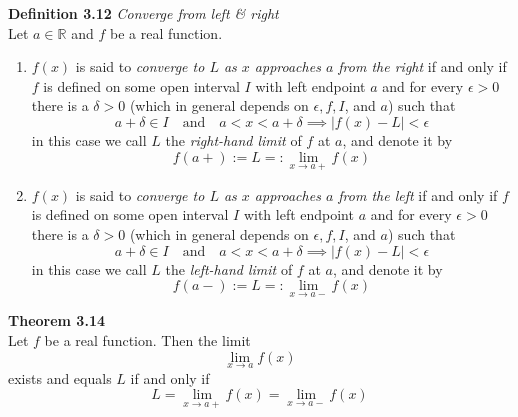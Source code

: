 \documentclass[8pt,landscape]{article}
\begin{document}
\begin{multicols}{3}
    \textbf{Definition 3.12} \emph{Converge from left \& right} \\
    Let $a \in \mathbb{R}$ and $f$ be a real function.
    \begin{enumerate}
        \item $f(x)$ is said to \emph{converge to $L$ as $x$ approaches $a$ from the right}
            if and only if $f$ is defined on some open interval $I$ with left endpoint $a$
            and for every $\epsilon > 0$ there is a $\delta > 0$
            (which in general depends on $\epsilon, f, I$, and $a$) such that
            \[
                a + \delta \in I \quad \text{and} \quad a < x < a + \delta \implies
                |f(x) - L| < \epsilon
            \]
            in this case we call $L$ the \emph{right-hand limit} of $f$ at $a$,
            and denote it by
            \[
                f(a+) := L =: \lim_{x \to a+} f(x)
            \]
        \item $f(x)$ is said to \emph{converge to $L$ as $x$ approaches $a$ from the left}
            if and only if $f$ is defined on some open interval $I$ with left endpoint $a$
            and for every $\epsilon > 0$ there is a $\delta > 0$
            (which in general depends on $\epsilon, f, I$, and $a$) such that
            \[
                a + \delta \in I \quad \text{and} \quad a < x < a + \delta \implies
                |f(x) - L| < \epsilon
            \]
            in this case we call $L$ the \emph{left-hand limit} of $f$ at $a$,
            and denote it by
            \[
                f(a-) := L =: \lim_{x \to a-} f(x)
            \]
    \end{enumerate}


    \textbf{Theorem 3.14} \\
    Let $f$ be a real function.
    Then the limit
    \[
        \lim_{x \to a} f(x)
    \]
    exists and equals $L$ if and only if
    \[
        L = \lim_{x \to a+} f(x) = \lim_{x \to a-} f(x)
    \]



\end{multicols}
\end{document}
